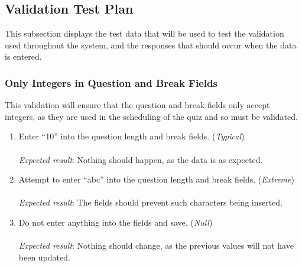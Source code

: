 \subsection{Validation Test Plan} %
\label{sub:validation_testing}
This subsection displays the test data that will be used to test the validation used throughout the system, and the responses that should occur when the data is entered.

\subsubsection{Only Integers in Question and Break Fields} %
\label{ssub:only_numbers_in_question_and_break_fields}
This validation will ensure that the question and break fields only accept integers, as they are used in the scheduling of the quiz and so must be validated.
\begin{enumerate}
  \item Enter ``10'' into the question length and break fields. (\textit{Typical})\\\\
  \textit{Expected result}: Nothing should happen, as the data is as expected.\\

  \item Attempt to enter ``abc'' into the question length and break fields. (\textit{Extreme})\\\\
  \textit{Expected result}: The fields should prevent such characters being inserted.\\

  \item Do not enter anything into the fields and save. (\textit{Null})\\\\
  \textit{Expected result}: Nothing should change, as the previous values will not have been updated.\\
\end{enumerate}

